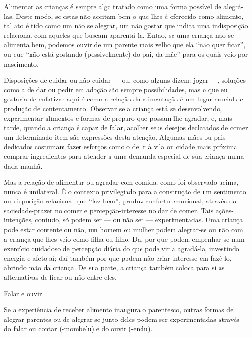 \documentclass{article}
\begin{document}
Alimentar as crian\c{c}as \'e sempre algo tratado como uma forma
poss\'ivel de alegr\'a-las. Deste modo, se estas n\~ao aceitam bem o
que lhes \'e oferecido como alimento, tal ato \'e tido como um n\~ao se
alegrar, um n\~ao gostar que indica uma indisposi\c{c}\~ao relacional
com aqueles que buscam aparent\'a-la. Ent\~ao, se uma crian\c{c}a n\~ao
se alimenta bem, podemos ouvir de um parente mais velho que ela
{\textquotedblleft}n\~ao quer ficar{\textquotedblright}, ou que
{\textquotedblleft}n\~ao est\'a gostando (possivelmente) do pai, da
m\~ae{\textquotedblright} para os quais veio por nascimento.

Disposi\c{c}\~oes de cuidar ou n\~ao cuidar --- ou, como alguns dizem:
jogar ---, solu\c{c}\~oes como a de dar ou pedir em ado\c{c}\~ao s\~ao
sempre possibilidades, mas o que eu gostaria de enfatizar aqui \'e como
a rela\c{c}\~ao da alimenta\c{c}\~ao \'e um lugar crucial de
produ\c{c}\~ao de contentamento.  Observar se a crian\c{c}a est\'a se
desenvolvendo, experimentar alimentos e formas de preparo que possam
lhe agradar, e, mais tarde, quando a crian\c{c}a \'e capaz de falar,
acolher seus desejos declarados de comer um determinado item s\~ao
express\~oes desta aten\c{c}\~ao. Algumas m\~aes ou pais dedicados
costumam fazer esfor\c{c}os como o de ir \`a vila ou cidade mais
pr\'oxima comprar ingredientes para atender a uma demanda especial de
sua crian\c{c}a numa dada manh\~a.

Mas a rela\c{c}\~ao de alimentar ou agradar com comida, como foi
observado acima, nunca \'e unilateral. \'E o contexto privilegiado para
a constru\c{c}\~ao de um sentimento ou disposi\c{c}\~ao relacional que
{\textquotedblleft}faz bem{\textquotedblright}, produz conforto
emocional, atrav\'es da saciedade-prazer no comer e
percep\c{c}\~ao-interesse no dar de comer. Tais
a\c{c}\~oes-inten\c{c}\~oes, contudo, s\'o podem ser --- ou n\~ao ser
--- experimentadas. Uma crian\c{c}a pode estar contente ou n\~ao, um
homem ou mulher podem alegrar-se ou n\~ao com a crian\c{c}a que lhes
veio como filha ou filho. Da\'i por que podem empenhar-se num
exerc\'icio cuidadoso de percep\c{c}\~ao di\'aria do que pode vir a
agrad\'a-la, investindo energia e afeto a\'i; da\'i tamb\'em por que
podem n\~ao criar interesse em faz\^e-lo, abrindo m\~ao da crian\c{c}a.
De sua parte, a crian\c{c}a tamb\'em coloca para si as alternativas de
ficar ou n\~ao entre eles. 

Falar e ouvir

Se a experi\^encia de receber alimento inaugura o parentesco, outras
formas de alegrar parentes ou de alegrar-se junto deles podem ser
experimentadas atrav\'es do falar ou contar (-mombe{\textquoteright}u)
e do ouvir (-endu).
\end{document}
